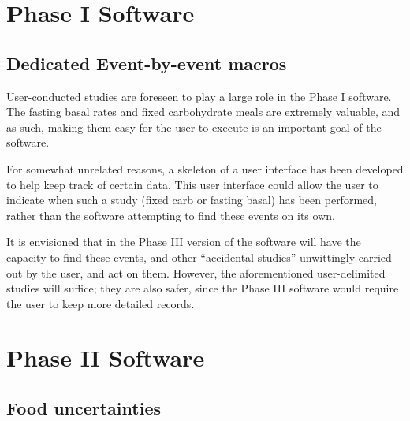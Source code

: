 \section{Phase I Software}

\subsection{Dedicated Event-by-event macros}

User-conducted studies are foreseen to play a large role in the Phase I software. The fasting basal 
rates and fixed carbohydrate meals are extremely valuable, and as such, making them easy for the user 
to execute is an important goal of the software.

For somewhat unrelated reasons, a skeleton of a user interface has been developed to help keep track 
of certain data. This user interface could allow the user to indicate when such a study (fixed carb 
or fasting basal) has been performed, rather than the software attempting to find these events on 
its own.

It is envisioned that in the Phase III version of the software will have the capacity to find these 
events, and other ``accidental studies'' unwittingly carried out by the user, and act on them. 
However, the aforementioned user-delimited studies will suffice; they are also safer, since the Phase 
III software would require the user to keep more detailed records.




\section{Phase II Software}

\subsection{Food uncertainties}

